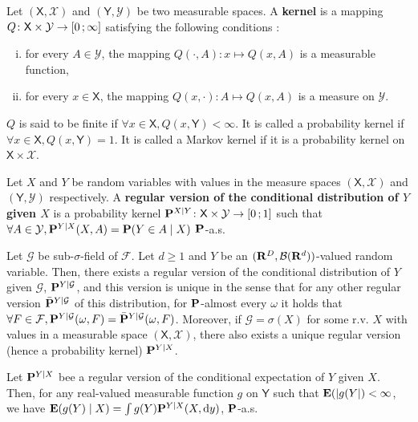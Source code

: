 	\begin{defn}
		Let $(\mathsf{X}, \mathcal{X})$ and $(\mathsf{Y}, \mathcal{Y})$ be two measurable spaces.
		A \textbf{kernel} is a mapping $Q \colon \mathsf{X} \times \mathcal{Y} \to \mathopen{}\mathclose{\left[0\mathclose{}\mathpunct{};\infty\right]}$ satisfying the following conditions :
		\begin{enumerate}[(i)]
			\item for every $A \in \mathcal{Y}$, the mapping $Q(\cdot, A) \colon x \mapsto Q(x,A)$ is a measurable function,
			\item for every $x \in \mathsf{X}$, the mapping $Q(x, \cdot) \colon A \mapsto Q(x,A)$ is a measure on $\mathcal{Y}$.
		\end{enumerate}
		$Q$ is said to be finite if $\forall x \in \mathsf{X}, Q(x,\mathsf{Y}) < \infty$.
		It is called a probability kernel if $\forall x \in \mathsf{X}, Q(x,\mathsf{Y}) = 1$.
		It is called a Markov kernel if it is a probability kernel on $\mathsf{X} \times \mathcal{X}$.
	\end{defn}

	\begin{defn}
		Let $X$ and $Y$ be random variables with values in the measure spaces $(\mathsf{X},\mathcal{X})$ and $(\mathsf{Y},\mathcal{Y})$ respectively.
		A \textbf{regular version of the conditional distribution of $Y$ given $X$} is a probability kernel $\mathbf{P}^{X \mid Y} \colon \mathsf{X} \times \mathcal{Y} \to \mathopen{}\mathclose{\left[0\mathclose{}\mathpunct{};1\right]}$ such that $\forall A \in \mathcal{Y}, \mathbf{P}^{Y \mid X}(X,A) = \mathbf{P}(Y \in A \mid X)$ $\mathbf{P}$-a.s.
	\end{defn}

	\begin{thm}
		Let $\mathcal{G}$ be sub-$\sigma$-field of $\mathcal{F}$.
		Let $d \geq 1$ and $Y$ be an $(\mathbf{R}^D, \mathcal{B}(\mathbf{R}^d))$-valued random variable.
		Then, there exists a regular version of the conditional distribution of $Y$ given $\mathcal{G}$, $\mathbf{P}^{Y \mid \mathcal{G}}$, and this version is unique in the sense that for any other regular version $\bar{\mathbf{P}}^{Y \mid \mathcal{G}}$ of this distribution, for $\mathbf{P}$-almost every $\omega$ it holds that $\forall F \in \mathcal{F}, \mathbf{P}^{Y \mid \mathcal{G}}(\omega,F) = \bar{\mathbf{P}}^{Y \mid \mathcal{G}}(\omega,F)$.
		Moreover, if $\mathcal{G} = \sigma(X)$ for some r.v. $X$ with values in a measurable space $(\mathsf{X},\mathcal{X})$, there also exists a unique regular version (hence a probability kernel) $\mathbf{P}^{Y \mid X}$.
	\end{thm}

	\begin{lem}
		Let $\mathbf{P}^{Y \mid X}$ bee a regular version of the conditional expectation of $Y$ given $X$.
		Then, for any real-valued measurable function $g$ on $\mathsf{Y}$ such that $\mathbf{E}(\left\lvert g(Y\right\rvert) < \infty$, we have $\mathbf{E}(g(Y) \mid X) = \int g(Y) \mathbf{P}^{Y \mid X}(X, \mathop{}\mathopen{}\mathrm{d} y)$, $\mathbf{P}$-a.s.
	\end{lem}


